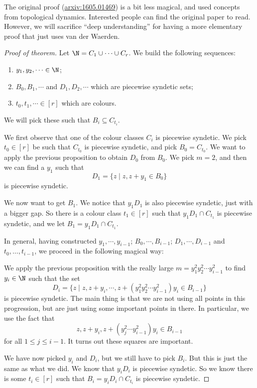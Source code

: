 \documentclass[a4paper]{article}
\begin{document}
The original proof (\href{https://arxiv.org/abs/1605.01469}{arxiv:1605.01469})  is a bit less magical, and used concepts from topological dynamics. Interested people can find the original paper to read. However, we will sacrifice ``deep understanding'' for having a more elementary proof that just uses van der Waerden.

\begin{proof}[Proof of theorem]
  Let $\N = C_1 \cup \cdots \cup C_r$. We build the following sequences:
  \begin{enumerate}
    \item $y_1, y_2, \cdots \in \N$;
    \item $B_0, B_1, \cdots$ and $D_1, D_2, \cdots$ which are piecewise syndetic sets;
    \item $t_0, t_1, \cdots \in [r]$ which are colours.
  \end{enumerate}
  We will pick these such that $B_i \subseteq C_{t_i}$.

  We first observe that one of the colour classes $C_i$ is piecewise syndetic. We pick $t_0 \in [r]$ be such that $C_{t_0}$ is piecewise syndetic, and pick $B_0 = C_{t_0}$. We want to apply the previous proposition to obtain $D_0$ from $B_0$. We pick $m = 2$, and then we can find a $y_1$ such that
  \[
    D_1 = \{z \mid z, z + y_1 \in B_0\}
  \]
  is piecewise syndetic.

  We now want to get $B_1$. We notice that $y_1 D_1$ is also piecewise syndetic, just with a bigger gap. So there is a colour class $t_1 \in [r]$ such that $y_1 D_1 \cap C_{t_1}$ is piecewise syndetic, and we let $B_1 = y_1 D_1 \cap C_{t_1}$.

  In general, having constructed $y_1, \cdots, y_{i - 1}$; $B_0, \cdots, B_{i - 1}$; $D_1, \cdots, D_{i - 1}$ and $t_0, \ldots, t_{i - 1}$, we proceed in the following magical way:

  We apply the previous proposition with the really large $m = y_1^2 y_2^2 \cdots y_{i - 1}^2$ to find $y_i \in \N$ such that the set
  \[
    D_i = \{z\mid z, z + y_i, \cdots, z + (y_1^2 y_2^2 \cdots y_{i - 1}^2) y_i \in B_{i - 1} \}
  \]
  is piecewise syndetic. The main thing is that we are not using all points in this progression, but are just using some important points in there. In particular, we use the fact that
  \[
    z, z + y_i, z + (y_j^2 \cdots y_{i - 1}^2)y_i \in B_{i - 1}
  \]
  for all $1 \leq j \leq i - 1$. It turns out these squares are important.

  We have now picked $y_i$ and $D_i$, but we still have to pick $B_i$. But this is just the same as what we did. We know that $y_i D_i$ is piecewise syndetic. So we know there is some $t_i \in [r]$ such that $B_i = y_i D_i \cap C_{t_i}$ is piecewise syndetic.


\end{proof}
\end{document}

